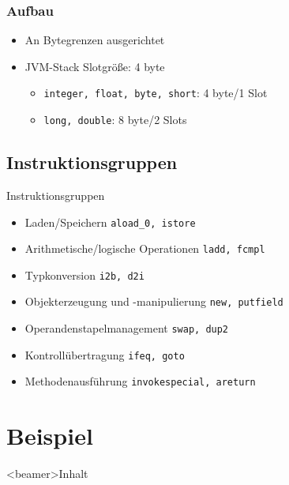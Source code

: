 \documentclass[10pt]{beamer}
\begin{document}

\begin{frame}[fragile]
\frametitle{Aufbau}
\begin{itemize}
\item An Bytegrenzen ausgerichtet
\item JVM-Stack Slotgröße: 4 byte
\begin{itemize}
\item {\tt integer, float, byte, short}: 4 byte/1 Slot
\item {\tt long, double}: 8 byte/2 Slots
\end{itemize}
\end{itemize}
\end{frame}


\subsection{Instruktionsgruppen}
\begin{frame}{Instruktionsgruppen}
\begin{itemize}
\item Laden/Speichern \hfill {\tt aload\_0, istore}\;\;\;\pause
\item Arithmetische/logische Operationen \hfill {\tt ladd, fcmpl}\;\;\;\pause
\item Typkonversion \hfill {\tt i2b, d2i}\;\;\;\pause
\item Objekterzeugung und -manipulierung \hfill {\tt new, putfield}\;\;\;\pause
\item Operandenstapelmanagement \hfill {\tt swap, dup2}\;\;\;\pause
\item Kontrollübertragung \hfill {\tt ifeq, goto}\;\;\;\pause
\item Methodenausführung \hfill {\tt invokespecial, areturn}\;\;\;
\end{itemize}
\end{frame}


\section{Beispiel}

\begin{frame}<beamer>{Inhalt}
\end{frame}
\end{document}
